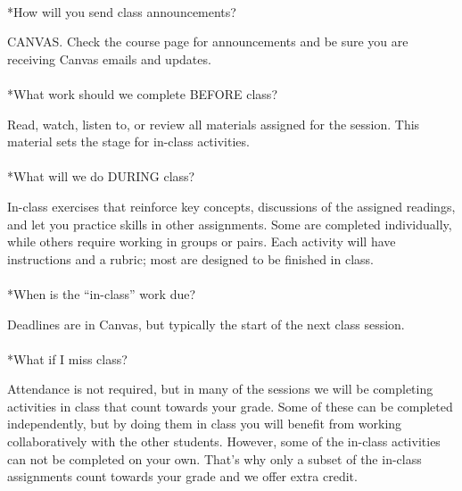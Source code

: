\documentclass[
  10pt,
  letterpaper,
  oneside,
  open=any]{scrbook}
\makeatletter
\let\oldparagraph\paragraph
\renewcommand{\paragraph}{
    \@ifstar
      \xxxParagraphStar
      \xxxParagraphNoStar
  }
\newcommand{\xxxParagraphStar}[1]{\oldparagraph*{#1}\mbox{}}
\newcommand{\xxxParagraphNoStar}[1]{\oldparagraph{#1}\mbox{}}
\makeatother
\begin{document}
\paragraph*{How will you send class
announcements?}\label{how-will-you-send-class-announcements}

CANVAS. Check the course page for announcements and be sure you are
receiving Canvas emails and updates.

\paragraph*{What work should we complete BEFORE
class?}\label{what-work-should-we-complete-before-class}

Read, watch, listen to, or review all materials assigned for the
session. This material sets the stage for in-class activities.

\paragraph*{What will we do DURING
class?}\label{what-will-we-do-during-class}

In-class exercises that reinforce key concepts, discussions of the
assigned readings, and let you practice skills in other assignments.
Some are completed individually, while others require working in groups
or pairs. Each activity will have instructions and a rubric; most are
designed to be finished in class.

\paragraph*{When is the ``in-class'' work
due?}\label{when-is-the-in-class-work-due}

Deadlines are in Canvas, but typically the start of the next class
session.

\paragraph*{What if I miss class?}\label{what-if-i-miss-class}

Attendance is not required, but in many of the sessions we will be
completing activities in class that count towards your grade. Some of
these can be completed independently, but by doing them in class you
will benefit from working collaboratively with the other students.
However, some of the in-class activities can not be completed on your
own. That's why only a subset of the in-class assignments count towards
your grade and we offer extra credit.
\end{document}

